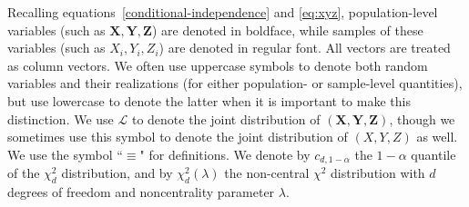 \documentclass[12pt]{article}
\theoremstyle{definition}
\theoremstyle{remark}
\newcommand{\prx}{\bm X}
\newcommand{\srx}{X}
\newcommand{\prz}{\bm Z}
\newcommand{\srz}{Z}
\newcommand{\pry}{{\bm Y}}
\newcommand{\sry}{Y}
\begin{document}
Recalling equations~\eqref{conditional-independence} and \eqref{eq:xyz}, population-level variables (such as $\prx,\pry,\prz$) are denoted in boldface, while samples of these variables (such as $\srx_i,\sry_i,\srz_i$) are denoted in regular font. All vectors are treated as column vectors. 
We often use uppercase symbols to denote both random variables and their realizations (for either population- or sample-level quantities), but use lowercase to denote the latter when it is important to make this distinction. We use $\mathcal L$ to denote the joint distribution of $(\prx,\pry,\prz)$, though we sometimes use this symbol to denote the joint distribution of $(\srx,\sry,\srz)$ as well. We use the symbol ``$\equiv$" for definitions. We denote by $c_{d,1-\alpha}$ the $1-\alpha$ quantile of the $\chi^2_d$ distribution, and by $\chi^2_d(\lambda)$ the non-central $\chi^2$ distribution with $d$ degrees of freedom and noncentrality parameter $\lambda$.
\end{document}
